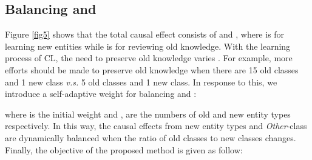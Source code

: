 \documentclass[11pt]{article}
\begin{document}
\subsection{Balancing  and  \label{subsec:4.4}}
Figure \ref{fig5} shows that the total causal effect  consists of  and , where  is for learning new entities while  is for reviewing old knowledge.
With the learning process of CL, the need to preserve old knowledge varies \citep{hou2019learning}.
For example, more efforts should be made to preserve old knowledge when there are 15 old classes and 1 new class \textit{v.s.} 5 old classes and 1 new class.
In response to this, we introduce a self-adaptive weight for balancing  and :

where  is the initial weight and , are the numbers of old and new entity types respectively.
In this way, the causal effects from new entity types and \textit{Other}-class are dynamically balanced when the ratio of old classes to new classes changes.
Finally, the objective of the proposed method is given as follow:
\end{document}
